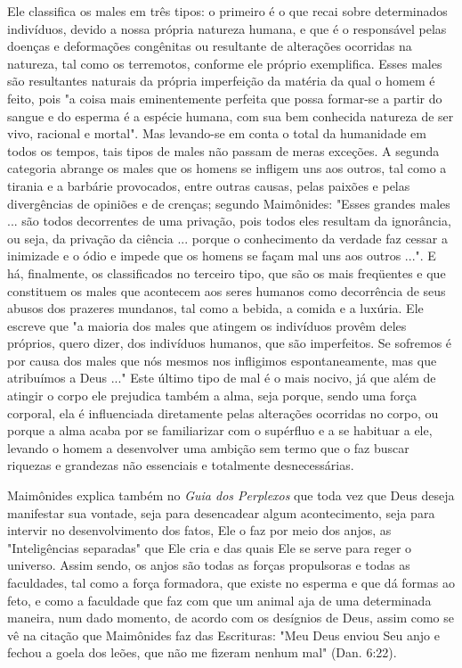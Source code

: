 \begin{itemize}
\begin{enumrate}
Ele classifica os males em três tipos: o primeiro é o que recai sobre
determinados indivíduos, devido a nossa própria natureza humana, e que é
o responsável pelas doenças e deformações congênitas ou resultante de
altera­ções ocorridas na natureza, tal como os terremotos, conforme ele
próprio exem­plifica. Esses males são resultantes naturais da própria
imperfeição da matéria da qual o homem é feito, pois "a coisa mais
eminentemente perfeita que possa formar-se a partir do sangue e do
esperma é a espécie humana, com sua bem conhecida natureza de ser vivo,
racional e mortal". Mas levando-se em conta o total da humanidade em
todos os tempos, tais tipos de males não passam de meras exceções. A
segunda categoria abrange os males que os homens se infli­gem uns aos
outros, tal como a tirania e a barbárie provocados, entre outras causas,
pelas paixões e pelas divergências de opiniões e de crenças; segundo
Maimônides: "Esses grandes males ... são todos decorrentes de uma
privação, pois todos eles resultam da ignorância, ou seja, da privação
da ciência ... por­que o conhecimento da verdade faz cessar a inimizade
e o ódio e impede que os homens se façam mal uns aos outros ...". E há,
finalmente, os classificados no terceiro tipo, que são os mais
freqüentes e que constituem os males que acontecem aos seres humanos
como decorrência de seus abusos dos prazeres mundanos, tal como a
bebida, a comida e a luxúria. Ele escreve que "a maioria dos males que
atingem os indivíduos provêm deles próprios, quero dizer, dos indivíduos
humanos, que são imperfeitos. Se sofremos é por causa dos males que nós
mesmos nos infligimos espontaneamente, mas que atribuímos a Deus ..."
Este último tipo de mal é o mais nocivo, já que além de atingir o corpo
ele pre­judica também a alma, seja porque, sendo uma força corporal, ela
é influencia­da diretamente pelas alterações ocorridas no corpo, ou
porque a alma acaba por se familiarizar com o supérfluo e a se habituar
a ele, levando o homem a desenvolver uma ambição sem termo que o faz
buscar riquezas e grandezas não essenciais e totalmente desnecessárias.

Maimônides explica também no \emph{Guia dos Perplexos} que toda vez que
Deus deseja manifestar sua vontade, seja para desencadear algum
aconteci­mento, seja para intervir no desenvolvimento dos fatos, Ele o
faz por meio dos anjos, as "Inteligências separadas" que Ele cria e das
quais Ele se serve para reger o universo. Assim sendo, os anjos são
todas as forças propulsoras e todas as faculdades, tal como a força
formadora, que existe no esperma e que dá formas 
ao feto, e como a faculdade que faz com que um animal aja de uma
deter­minada maneira, num dado momento, de acordo com os desígnios de
Deus, assim como se vê na citação que Maimônides faz das Escrituras:
"Meu Deus en­viou Seu anjo e fechou a goela dos leões, que não me
fizeram nenhum mal" (Dan. 6:22).


\end{enumrate}
\end{itemize}
